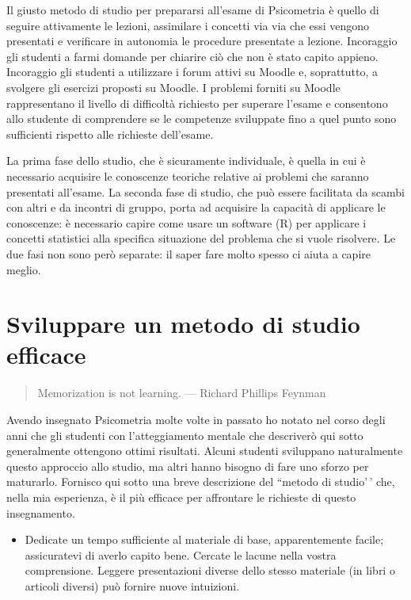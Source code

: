\documentclass[
  11pt,
  italian,
  a4paper,
  extrafontsizes,onecolumn,openright
  ]{memoir}
\providecommand{\tightlist}{%
  \setlength{\itemsep}{0pt}\setlength{\parskip}{0pt}}
\newcommand{\R}{\textsf{R}} %
\begin{document}
Il giusto metodo di studio per prepararsi all'esame di Psicometria è quello di seguire attivamente le lezioni, assimilare i concetti via via che essi vengono presentati e verificare in autonomia le procedure presentate a lezione. Incoraggio gli studenti a farmi domande per chiarire ciò che non è stato capito appieno. Incoraggio gli studenti a utilizzare i forum attivi su Moodle e, soprattutto, a svolgere gli esercizi proposti su Moodle. I problemi forniti su Moodle rappresentano il livello di difficoltà richiesto per superare l'esame e consentono allo studente di comprendere se le competenze sviluppate fino a quel punto sono sufficienti rispetto alle richieste dell'esame.

La prima fase dello studio, che è sicuramente individuale, è quella in cui è necessario acquisire le conoscenze teoriche relative ai problemi che saranno presentati all'esame. La seconda fase di studio, che può essere facilitata da scambi con altri e da incontri di gruppo, porta ad acquisire la capacità di applicare le conoscenze: è necessario capire come usare un software (\R) per applicare i concetti statistici alla specifica situazione del problema che si vuole risolvere. Le due fasi non sono però separate: il saper fare molto spesso ci aiuta a capire meglio.

\hypertarget{sviluppare-un-metodo-di-studio-efficace}{%
\section*{Sviluppare un metodo di studio efficace}\label{sviluppare-un-metodo-di-studio-efficace}}

\begin{quote}
Memorization is not learning. --- Richard Phillips Feynman
\end{quote}

Avendo insegnato Psicometria molte volte in passato ho notato nel corso degli anni che gli studenti con l'atteggiamento mentale che descriverò qui sotto generalmente ottengono ottimi risultati. Alcuni studenti sviluppano naturalmente questo approccio allo studio, ma altri hanno bisogno di fare uno sforzo per maturarlo. Fornisco qui sotto una breve descrizione del ``metodo di studio'\,' che, nella mia esperienza, è il più efficace per affrontare le richieste di questo insegnamento.

\begin{itemize}
\tightlist
\item
  Dedicate un tempo sufficiente al materiale di base, apparentemente facile; assicuratevi di averlo capito bene. Cercate le lacune nella vostra comprensione. Leggere presentazioni diverse dello stesso materiale (in libri o articoli diversi) può fornire nuove intuizioni.
\end{itemize}
\end{document}
